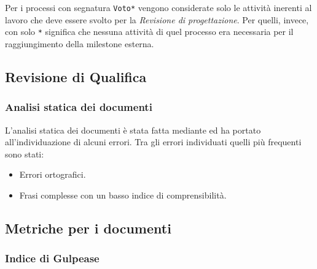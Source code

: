 Per i processi con segnatura \texttt{Voto*} vengono considerate solo le attività inerenti al lavoro che deve essere svolto per la \textit{Revisione di progettazione}. Per quelli, invece, con solo \texttt{*} significa che nessuna attività di quel processo era necessaria per il raggiungimento della milestone esterna.

\newpage

\subsection{Revisione di Qualifica}

\subsubsection{Analisi statica dei documenti}
L'analisi statica dei documenti è stata fatta mediante  ed ha portato all'individuazione di alcuni errori. Tra gli errori individuati quelli più frequenti sono stati:
		\begin{itemize}
			\item Errori ortografici.
			\item Frasi complesse con un basso indice di comprensibilità.
		\end{itemize}

\subsection{Metriche per i documenti}

\subsubsection{Indice di Gulpease}

